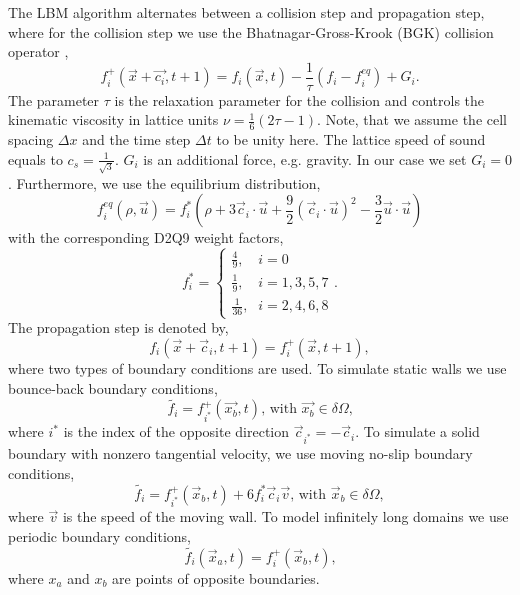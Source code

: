\documentclass[final,leqno,onefignum,onetabnum]{siamltexmm}
\begin{document}
The LBM algorithm alternates between a collision step and propagation step, where for the collision step we use the Bhatnagar-Gross-Krook (BGK) collision operator \cite{BGK},
\begin{equation}
	f_i^+(\vec{x}+\vec{c_i},t+1) = f_i(\vec{x},t) - \frac1\tau(f_i-f_i^{eq}) + G_i \text{.}
\end{equation}
The parameter $\tau$ is the relaxation parameter for the collision and controls the kinematic viscosity in lattice units $\nu = \frac16(2\tau - 1)$. Note, that we assume the cell spacing $\Delta x$ and the time step $\Delta t$ to be unity here. The lattice speed of sound equals to $c_s =\frac{1}{\sqrt{3}}$. $G_i$ is an additional force, e.g. gravity. In our case we set $G_i = 0$. Furthermore, we use the equilibrium distribution,
\begin{equation}
	f_i^{eq}(\rho,\vec{u}) = f_i^*(\rho + 3\vec c_i \cdot \vec{u} + \frac92(\vec c_i  \cdot \vec{u})^2 - \frac32 \vec u\cdot \vec u)
  \label{equil}
\end{equation}
with the corresponding D2Q9 weight factors,
$$
f_i^* = \begin{cases} \frac49 \text{,} & i = 0 \\ \frac19 \text{,} & i = 1,3,5,7 \\ \frac{1}{36} \text{,} &  i = 2,4,6,8 \end{cases} \text{.}
$$
The propagation step is denoted by,
\begin{equation}
	f_i(\vec{x}+\vec c_i,t+1) = f_i^+(\vec{x},t+1),
\end{equation}
where two types of boundary conditions are used. To simulate static walls we use bounce-back boundary conditions,
\begin{equation}
	\tilde{f_i} = f_{i^*}^+(\vec{x_b},t) \text{, with } \vec{x_b} \in \delta\Omega \text{,}
\end{equation}
where $i^*$ is the index of the opposite direction $\vec c_{i^*} = -\vec c_i$. To simulate a solid boundary with nonzero tangential velocity, we use moving no-slip boundary conditions,
\begin{equation}
	\tilde{f_i} = f_{i^*}^+(\vec x_b,t) + 6 f_i^*\vec c_i \vec{v} \text{, with } \vec x_b  \in \delta\Omega,
\end{equation}
where $\vec{v}$ is the speed of the moving wall. To model infinitely long domains we use periodic boundary conditions,
\begin{equation}
	\tilde{f_i}(\vec x_a ,t) = f_i^+(\vec x_b ,t) \text{,}
\end{equation}
where $x_a$ and $x_b$ are points of opposite boundaries.
\end{document}
